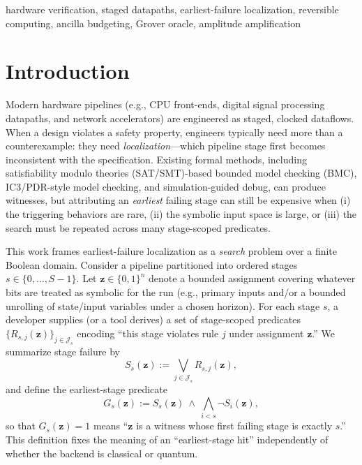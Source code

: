 \documentclass[conference]{IEEEtran}
\newcommand{\zvec}{\mathbf{z}}
\begin{document}
\begin{IEEEkeywords}
hardware verification, staged datapaths, earliest-failure localization, reversible computing, ancilla budgeting, Grover oracle, amplitude amplification
\end{IEEEkeywords}

\IEEEpubidadjcol

\section{Introduction}
Modern hardware pipelines (e.g., CPU front-ends, digital signal processing datapaths, and network accelerators) are engineered as staged, clocked dataflows. When a design violates a safety property, engineers typically need more than a counterexample: they need \emph{localization}---which pipeline stage first becomes inconsistent with the specification. Existing formal methods, including satisfiability modulo theories (SAT/SMT)-based bounded model checking (BMC), IC3/PDR-style model checking, and simulation-guided debug, can produce witnesses, but attributing an \emph{earliest} failing stage can still be expensive when (i) the triggering behaviors are rare, (ii) the symbolic input space is large, or (iii) the search must be repeated across many stage-scoped predicates.\cite{clarke1999modelchecking,clarke2001bmc,bradley2011ic3}

This work frames earliest-failure localization as a \emph{search} problem over a finite Boolean domain. Consider a pipeline partitioned into ordered stages $s \in \{0,\dots,S-1\}$. Let $\zvec \in \{0,1\}^n$ denote a bounded assignment covering whatever bits are treated as symbolic for the run (e.g., primary inputs and/or a bounded unrolling of state/input variables under a chosen horizon). For each stage $s$, a developer supplies (or a tool derives) a set of stage-scoped predicates $\{R_{s,j}(\zvec)\}_{j\in\mathcal{J}_s}$ encoding “this stage violates rule $j$ under assignment $\zvec$.” We summarize stage failure by
\begin{equation}
S_s(\zvec) := \bigvee_{j\in\mathcal{J}_s} R_{s,j}(\zvec),
\end{equation}
and define the earliest-stage predicate
\begin{equation}
G_s(\zvec) := S_s(\zvec)\ \wedge\ \bigwedge_{i<s}\neg S_i(\zvec),
\end{equation}
so that $G_s(\zvec)=1$ means “$\zvec$ is a witness whose first failing stage is exactly $s$.” This definition fixes the meaning of an “earliest-stage hit” independently of whether the backend is classical or quantum.
\end{document}
